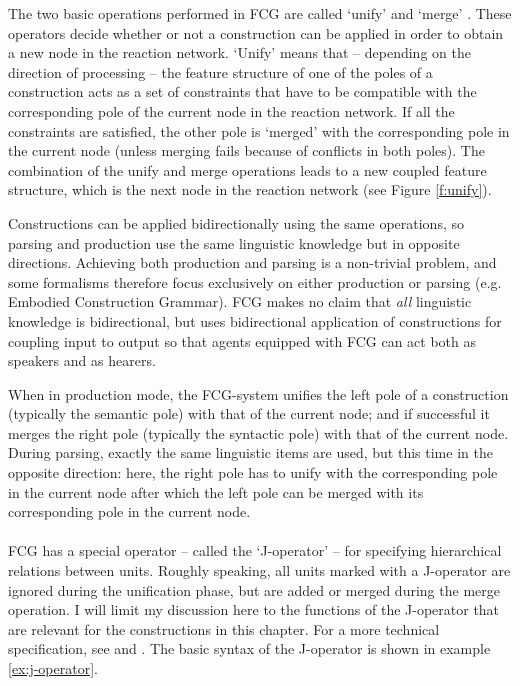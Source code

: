 \vspace{0.3cm}
 The two basic operations performed in FCG are called `unify' and `merge' \citep[not to be confused with `merge' in Minimalism]{steels06unify}. These operators decide whether or not a construction can be applied in order to obtain a new node in the reaction network. `Unify' means that -- depending on the direction of processing -- the feature structure of one of the poles of a construction acts as a set of constraints that have to be compatible with the corresponding pole of the current node in the reaction network. If all the constraints are satisfied, the other pole is `merged' with the corresponding pole in the current node (unless merging fails because of conflicts in both poles). The combination of the unify and merge operations leads to a new coupled feature structure, which is the next node in the reaction network (see Figure \ref{f:unify}).

Constructions can be applied bidirectionally using the same operations, so parsing and production use the same linguistic knowledge but in opposite directions. Achieving both production and parsing is a non-trivial problem, and some formalisms therefore focus exclusively on either production or parsing (e.g. Embodied Construction Grammar). FCG makes no claim that {\em all} linguistic knowledge is bidirectional, but uses bidirectional application of constructions for coupling input to output so that agents equipped with FCG can act both as speakers and as hearers. 

When in production mode, the FCG-system unifies the left pole of a construction (typically the semantic pole) with that of the current node; and if successful it merges the right pole (typically the syntactic pole) with that of the current node. During parsing, exactly the same linguistic items are used, but this time in the opposite direction: here, the right pole has to unify with the corresponding pole in the current node after which the left pole can be merged with its corresponding pole in the current node.
\\
\\
 FCG has a special operator -- called the `J-operator' -- for specifying hierarchical relations between units. Roughly speaking, all units marked with a J-operator are ignored during the unification phase, but are added or merged during the merge operation. I will limit my discussion here to the functions of the J-operator that are relevant for the constructions in this chapter. For a more technical specification, see \citet[chapter 4]{debeule07compositionality} and \citet{debeule05hierarchy}. The basic syntax of the J-operator is shown in example \ref{ex:j-operator}.

